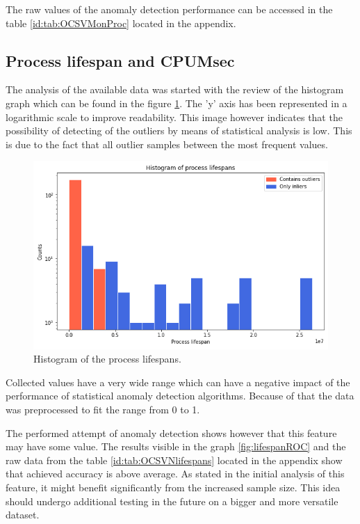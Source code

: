 \documentclass[a4paper,twoside,12pt]{book}
\begin{document}
The raw values of the anomaly detection performance can be accessed in the table \ref{id:tab:OCSVMonProc} located in the 
appendix. 

\subsection{Process lifespan and CPUMsec}
The analysis of the available data was started with the review of the histogram graph which can be found in the 
figure \ref{fig:lifespanHist}. The 'y' axis has been represented in a logarithmic scale to improve readability.
This image however indicates that the possibility of detecting of the outliers by means of statistical
analysis is low. This is due to the fact that all outlier samples between the most frequent values. 

\begin{figure}
	\centering
	\includegraphics[scale=0.9]{images/LifespanHist}
	\caption{Histogram of the process lifespans.}
	\label{fig:lifespanHist}
 \end{figure}


Collected values have a very wide range which can have a negative impact of the performance of statistical anomaly detection algorithms.
Because of that the data was preprocessed to fit the range from 0 to 1. 

The performed attempt of anomaly detection shows however that this feature may have some value. The results visible in the graph
\ref{fig:lifespanROC} and the raw data from the table \ref{id:tab:OCSVNlifespans} located in the appendix show that achieved accuracy 
is above average. As stated in the initial analysis of this feature, it might benefit significantly from the increased sample size.
This idea should undergo additional testing in the future on a bigger and more versatile dataset.
\end{document}
